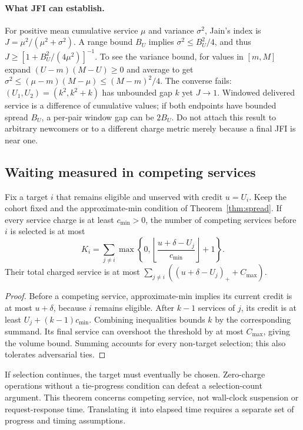 \paragraph{What JFI can establish.}
For positive mean cumulative service $\mu$ and variance $\sigma^2$, Jain's
index is $J=\mu^2/(\mu^2+\sigma^2)$. A range bound $B_U$ implies
$\sigma^2\le B_U^2/4$, and thus
$J\ge [1+B_U^2/(4\mu^2)]^{-1}$.
To see the variance bound, for values in $[m,M]$ expand
$(U-m)(M-U)\ge0$ and average to get
$\sigma^2\le(\mu-m)(M-\mu)\le(M-m)^2/4$.
The converse fails: $(U_1,U_2)=(k^2,k^2+k)$ has unbounded gap $k$ yet $J\to1$.
Windowed delivered service is a difference of cumulative values; if both
endpoints have bounded spread $B_U$, a per-pair window gap can be $2B_U$.
Do not attach this result to arbitrary newcomers or to a different charge
metric merely because a final JFI is near one.

\subsection{Waiting measured in competing services}
\begin{theorem}
\label{thm:waiting}
Fix a target $i$ that remains eligible and unserved with credit $u=U_i$.
Keep the cohort fixed and the approximate-min condition of
Theorem~\ref{thm:spread}. If every service charge is at least $c_{\min}>0$,
the number of competing services before $i$ is selected is at most
\begin{equation}
 K_i=\sum_{j\ne i}\max\!\left\{0,
 \left\lfloor\frac{u+\delta-U_j}{c_{\min}}\right\rfloor+1\right\}.
 \label{eq:waiting}
\end{equation}
Their total charged service is at most
$\sum_{j\ne i}((u+\delta-U_j)_++C_{\max})$.
\end{theorem}
\begin{proof}
Before a competing service, approximate-min implies its current credit is
at most $u+\delta$, because $i$ remains eligible. After $k-1$ services of
$j$, its credit is at least $U_j+(k-1)c_{\min}$. Combining inequalities bounds
$k$ by the corresponding summand. Its final service can overshoot the
threshold by at most $C_{\max}$, giving the volume bound. Summing accounts
for every non-target selection; this also tolerates adversarial ties.
\end{proof}
If selection continues, the target must eventually be chosen. Zero-charge
operations without a tie-progress condition can defeat a selection-count
argument. This theorem concerns competing service, not wall-clock suspension
or request-response time. Translating it into elapsed time requires a
separate set of progress and timing assumptions.

